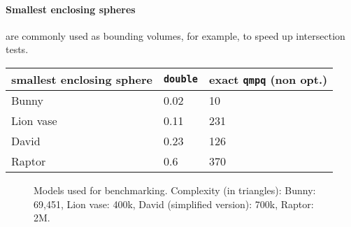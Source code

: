 
\paragraph{Smallest enclosing spheres} are commonly used as bounding
volumes, for example, to speed up intersection tests.

\begin{tabular}{l|ll}
  \textbf{smallest enclosing sphere} & \texttt{double} & exact
    \texttt{qmpq} (non opt.)\\\hline
  Bunny     & 0.02 &  10 \\
  Lion vase & 0.11 & 231 \\
  David     & 0.23 & 126 \\
  Raptor    & 0.6  & 370
\end{tabular}


\begin{figure}
  \centering
  \caption{Models used for benchmarking. 
           Complexity (in triangles):
           Bunny: 69,451,
           Lion vase: 400k,
           David (simplified version): 700k,
           Raptor: 2M.}
  \label{fig:models}
\end{figure}